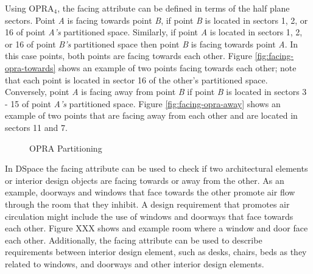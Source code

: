 \documentclass[12pt]{ucthesis}
\begin{document}
Using OPRA$_{4}$, the facing attribute can be defined in terms of the half plane sectors. Point \emph{A} is facing towards point \emph{B}, if point \emph{B} is located in sectors 1, 2, or 16 of point \emph{A's} partitioned space. Similarly, if point \emph{A} is located in sectors 1, 2, or 16 of point \emph{B's} partitioned space then point \emph{B} is facing towards point \emph{A}. In this case points, both points are facing towards each other. Figure \ref{fig:facing-opra-towards} shows an example of two points facing towards each other; note that each point is located in sector 16 of the other's partitioned space. Conversely,  point \emph{A} is facing away from point \emph{B} if point \emph{B} is located in sectors 3 - 15 of point \emph{A's} partitioned space. Figure \ref{fig:facing-opra-away} shows an example of two points that are facing away from each other and are located in sectors 11 and 7. 

\begin{figure}[H]
 \centering
  \hspace{10 mm}
 \caption{OPRA Partitioning }
\label{opra-facing}
\end{figure}

In DSpace the facing attribute can be used to check if two architectural elements or interior design objects are facing towards or away from the other. As an example, doorways and windows that face towards the other promote air flow through the room that they inhibit. A design requirement that promotes air circulation might include the use of windows and doorways that face towards each other. Figure XXX shows and example room where a window and door face each other. Additionally, the facing attribute can be used to describe requirements between interior design element, such as desks, chairs, beds as they related to windows, and doorways and other interior design elements.  
\end{document}
